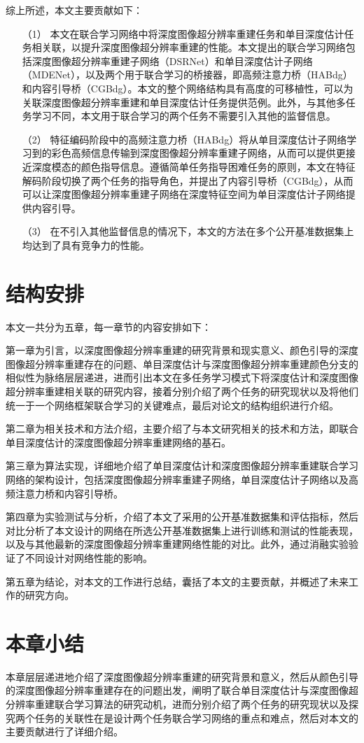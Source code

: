 综上所述，本文主要贡献如下：
\begin{enumerate}[leftmargin=55bp]
\item[（1）]	本文在联合学习网络中将深度图像超分辨率重建任务和单目深度估计任务相关联，以提升深度图像超分辨率重建的性能。本文提出的联合学习网络包括深度图像超分辨率重建子网络（DSRNet）和单目深度估计子网络（MDENet），以及两个用于联合学习的桥接器，即高频注意力桥（HABdg）和内容引导桥（CGBdg）。本文的整个网络结构具有高度的可移植性，可以为关联深度图像超分辨率重建和单目深度估计任务提供范例。此外，与其他多任务学习不同，本文用于联合学习的两个任务不需要引入其他的监督信息。  
\item[（2）]	 特征编码阶段中的高频注意力桥（HABdg）将从单目深度估计子网络学习到的彩色高频信息传输到深度图像超分辨率重建子网络，从而可以提供更接近深度模态的颜色指导信息。遵循简单任务指导困难任务的原则，本文在特征解码阶段切换了两个任务的指导角色，并提出了内容引导桥（CGBdg），从而可以让深度图像超分辨率重建子网络在深度特征空间为单目深度估计子网络提供内容引导。
\item[（3）]	在不引入其他监督信息的情况下，本文的方法在多个公开基准数据集上均达到了具有竞争力的性能。 
\end{enumerate}


\section{结构安排}

本文一共分为五章，每一章节的内容安排如下：

第一章为引言，以深度图像超分辨率重建的研究背景和现实意义、颜色引导的深度图像超分辨率重建存在的问题、单目深度估计与深度图像超分辨率重建颜色分支的相似性为脉络层层递进，进而引出本文在多任务学习模式下将深度估计和深度图像超分辨率重建相关联的研究内容，接着分别介绍了两个任务的研究现状以及将他们统一于一个网络框架联合学习的关键难点，最后对论文的结构组织进行介绍。

第二章为相关技术和方法介绍，主要介绍了与本文研究相关的技术和方法，即联合单目深度估计的深度图像超分辨率重建网络的基石。

第三章为算法实现，详细地介绍了单目深度估计和深度图像超分辨率重建联合学习网络的架构设计，包括深度图像超分辨率重建子网络，单目深度估计子网络以及高频注意力桥和内容引导桥。

第四章为实验测试与分析，介绍了本文了采用的公开基准数据集和评估指标，然后对比分析了本文设计的网络在所选公开基准数据集上进行训练和测试的性能表现，以及与其他最新的深度图像超分辨率重建网络性能的对比。此外，通过消融实验验证了不同设计对网络性能的影响。

第五章为结论，对本文的工作进行总结，囊括了本文的主要贡献，并概述了未来工作的研究方向。


\section{本章小结}

本章层层递进地介绍了深度图像超分辨率重建的研究背景和意义，然后从颜色引导的深度图像超分辨率重建存在的问题出发，阐明了联合单目深度估计与深度图像超分辨率重建联合学习算法的研究动机，进而分别介绍了两个任务的研究现状以及探究两个任务的关联性在是设计两个任务联合学习网络的重点和难点，然后对本文的主要贡献进行了详细介绍。
